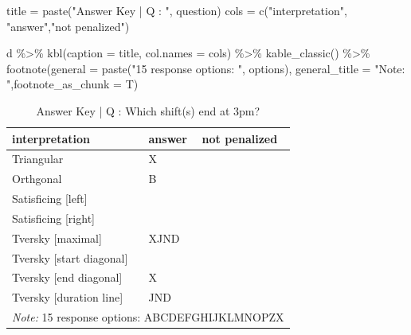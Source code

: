 \documentclass[
  letterpaper,
  DIV=11,
  numbers=noendperiod]{scrreprt}
\newenvironment{Shaded}{\begin{snugshade}}{\end{snugshade}}
\newcommand{\AttributeTok}[1]{\textcolor[rgb]{0.40,0.45,0.13}{#1}}
\newcommand{\FunctionTok}[1]{\textcolor[rgb]{0.28,0.35,0.67}{#1}}
\newcommand{\NormalTok}[1]{\textcolor[rgb]{0.00,0.23,0.31}{#1}}
\newcommand{\OtherTok}[1]{\textcolor[rgb]{0.00,0.23,0.31}{#1}}
\newcommand{\SpecialCharTok}[1]{\textcolor[rgb]{0.37,0.37,0.37}{#1}}
\newcommand{\StringTok}[1]{\textcolor[rgb]{0.13,0.47,0.30}{#1}}
\begin{document}
\begin{Shaded}
\begin{Highlighting}[]
\NormalTok{title }\OtherTok{=} \FunctionTok{paste}\NormalTok{(}\StringTok{"Answer Key | Q : "}\NormalTok{, question)}
\NormalTok{cols }\OtherTok{=} \FunctionTok{c}\NormalTok{(}\StringTok{"interpretation"}\NormalTok{, }\StringTok{"answer"}\NormalTok{,}\StringTok{"not penalized"}\NormalTok{)}

\NormalTok{d }\SpecialCharTok{\%\textgreater{}\%} \FunctionTok{kbl}\NormalTok{(}\AttributeTok{caption =}\NormalTok{ title, }\AttributeTok{col.names =}\NormalTok{ cols) }\SpecialCharTok{\%\textgreater{}\%} \FunctionTok{kable\_classic}\NormalTok{() }\SpecialCharTok{\%\textgreater{}\%}
  \FunctionTok{footnote}\NormalTok{(}\AttributeTok{general =} \FunctionTok{paste}\NormalTok{(}\StringTok{"15 response options: "}\NormalTok{, options), }\AttributeTok{general\_title =} \StringTok{"Note: "}\NormalTok{,}\AttributeTok{footnote\_as\_chunk =}\NormalTok{ T)}
\end{Highlighting}
\end{Shaded}

\begin{table}

\caption{Answer Key | Q :  Which shift(s) end at 3pm?}
\centering
\begin{tabular}[t]{l|l|l}
\hline
interpretation & answer & not penalized\\
\hline
Triangular & X & \\
\hline
Orthgonal & B & \\
\hline
Satisficing [left] &  & \\
\hline
Satisficing [right] &  & \\
\hline
Tversky [maximal] & XJND & \\
\hline
Tversky [start diagonal] &  & \\
\hline
Tversky [end diagonal] & X & \\
\hline
Tversky [duration line] & JND & \\
\hline
\multicolumn{3}{l}{\rule{0pt}{1em}\textit{Note: } 15 response options:  ABCDEFGHIJKLMNOPZX}\\
\end{tabular}
\end{table}
\end{document}
